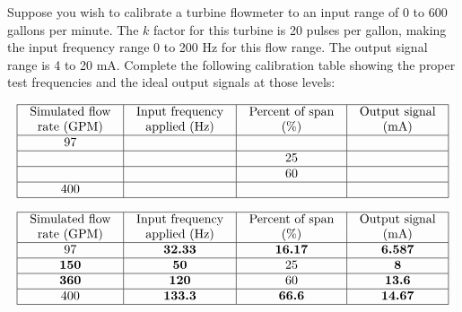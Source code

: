 

Suppose you wish to calibrate a turbine flowmeter to an input range of 0 to 600 gallons per minute.  The $k$ factor for this turbine is 20 pulses per gallon, making the input frequency range 0 to 200 Hz for this flow range.  The output signal range is 4 to 20 mA.  Complete the following calibration table showing the proper test frequencies and the ideal output signals at those levels:


$$\vbox{\offinterlineskip
\halign{\strut
\vrule \quad\hfil # \ \hfil & 
\vrule \quad\hfil # \ \hfil & 
\vrule \quad\hfil # \ \hfil & 
\vrule \quad\hfil # \ \hfil \vrule \cr
\noalign{\hrule}
%
Simulated flow & Input frequency & Percent of span & Output signal \cr
%
rate (GPM) & applied (Hz) & (\%) & (mA) \cr
%
\noalign{\hrule}
%
97 &  &  &  \cr
%
\noalign{\hrule}
%
 &  & 25 &  \cr
%
\noalign{\hrule}
%
 &  & 60 &  \cr
%
\noalign{\hrule}
%
400 &  &  &  \cr
%
\noalign{\hrule}
} %
}$$ %








$$\vbox{\offinterlineskip
\halign{\strut
\vrule \quad\hfil # \ \hfil & 
\vrule \quad\hfil # \ \hfil & 
\vrule \quad\hfil # \ \hfil & 
\vrule \quad\hfil # \ \hfil \vrule \cr
\noalign{\hrule}
%
Simulated flow & Input frequency & Percent of span & Output signal \cr
%
rate (GPM) & applied (Hz) & (\%) & (mA) \cr
%
\noalign{\hrule}
%
97 & {\bf 32.33}  & {\bf 16.17} & {\bf 6.587} \cr
%
\noalign{\hrule}
%
{\bf 150} & {\bf 50} & 25 & {\bf 8} \cr
%
\noalign{\hrule}
%
{\bf 360} & {\bf 120} & 60 & {\bf 13.6} \cr
%
\noalign{\hrule}
%
400 & {\bf 133.3} & {\bf 66.6} & {\bf 14.67} \cr
%
\noalign{\hrule}
} %
}$$ %












